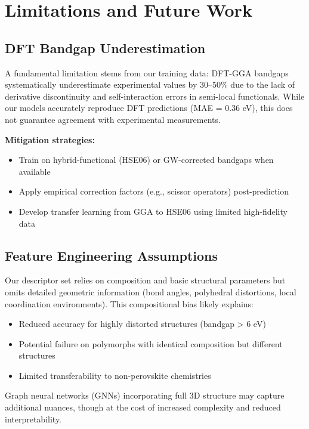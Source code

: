 \documentclass[conference]{IEEEtran}
\begin{document}
\section{Limitations and Future Work}

\subsection{DFT Bandgap Underestimation}
A fundamental limitation stems from our training data: DFT-GGA bandgaps systematically underestimate experimental values by 30--50\% due to the lack of derivative discontinuity and self-interaction errors in semi-local functionals. While our models accurately reproduce DFT predictions (MAE = 0.36 eV), this does not guarantee agreement with experimental measurements.

\textbf{Mitigation strategies:}
\begin{itemize}
  \item Train on hybrid-functional (HSE06) or GW-corrected bandgaps when available
  \item Apply empirical correction factors (e.g., scissor operators) post-prediction
  \item Develop transfer learning from GGA to HSE06 using limited high-fidelity data
\end{itemize}

\subsection{Feature Engineering Assumptions}
Our descriptor set relies on composition and basic structural parameters but omits detailed geometric information (bond angles, polyhedral distortions, local coordination environments). This compositional bias likely explains:
\begin{itemize}
  \item Reduced accuracy for highly distorted structures (bandgap > 6 eV)
  \item Potential failure on polymorphs with identical composition but different structures
  \item Limited transferability to non-perovskite chemistries
\end{itemize}

Graph neural networks (GNNs) incorporating full 3D structure may capture additional nuances, though at the cost of increased complexity and reduced interpretability.
\end{document}
